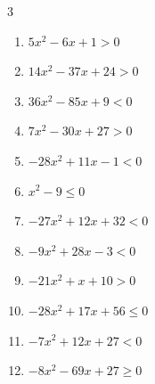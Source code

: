 \begin{multicols}{3}
\begin{enumerate}
  \item $5x^{2}-6x+1>0$


  \item $14x^{2}-37x+24>0$


  \item $36x^{2}-85x+9<0$


  \item $7x^{2}-30x+27>0$


  \item $-28x^{2}+11x-1<0$


  \item $x^{2}-9\leq 0$

        \phantom{$\displaystyle -3 \leqq x \leqq 3$}

  \item $-27x^{2}+12x+32<0$


  \item $-9x^{2}+28x-3<0$


  \item $-21x^{2}+x+10>0$


  \item $-28x^{2}+17x+56\leq 0$


\columnbreak %

  \item $-7x^{2}+12x+27<0$


  \item $-8x^{2}-69x+27\geq 0$



\end{enumerate}
\end{multicols}
